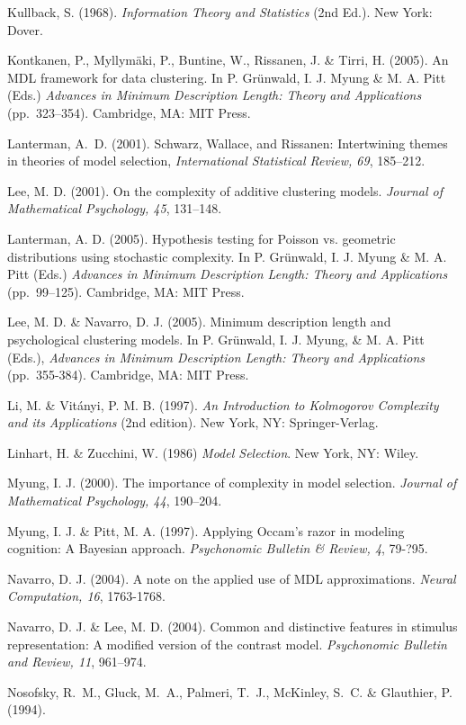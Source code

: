 \documentclass{elsart}
\begin{document}
\begin{list}{}{\setlength{\leftmargin}{12pt}\setlength{\itemindent}{-12pt}\setlength{\parsep}{0pt}}
\item Kullback, S. (1968). {\it Information Theory and Statistics} (2nd Ed.). New York: Dover.
\item Kontkanen, P., Myllym\"{a}ki, P., Buntine, W., Rissanen, J. \& Tirri, H. (2005). An MDL framework
for data clustering. In P. Gr\"{u}nwald, I. J. Myung \& M. A. Pitt (Eds.) {\it Advances in Minimum
Description Length: Theory and Applications} (pp.~323--354). Cambridge, MA: MIT Press.
\item Lanterman, A.~D. (2001). Schwarz, Wallace, and Rissanen: Intertwining themes in theories of model selection, {\em International Statistical Review, 69}, 185--212.
\item Lee, M. D. (2001). On the complexity of additive clustering models. {\it Journal of Mathematical
Psychology, 45}, 131--148.
\item Lanterman, A. D. (2005). Hypothesis testing for Poisson vs. geometric distributions using stochastic
complexity. In P. Gr\"{u}nwald, I. J. Myung \& M. A. Pitt (Eds.) {\it Advances in Minimum
Description Length: Theory and Applications} (pp.~99--125). Cambridge, MA: MIT Press.
\item Lee, M. D. \& Navarro, D. J. (2005). Minimum description length and psychological clustering models.
In P. Gr\"{u}nwald, I. J. Myung, \& M. A. Pitt (Eds.), {\it Advances in Minimum Description Length: Theory
and Applications} (pp.~355-384). Cambridge, MA: MIT Press.
\item Li, M. \& Vit\'{a}nyi, P. M. B. (1997). {\it An Introduction to Kolmogorov Complexity and its
Applications} (2nd edition). New York, NY: Springer-Verlag.
\item Linhart, H. \& Zucchini, W. (1986)  {\em Model Selection}. New York, NY: Wiley.
\item Myung, I. J. (2000). The importance of complexity in model selection. {\it Journal of Mathematical
Psychology, 44}, 190--204.
\item Myung, I. J. \& Pitt, M. A. (1997). Applying Occam's razor in modeling cognition: A Bayesian
approach. {\it Psychonomic Bulletin \& Review, 4}, 79-?95.
\item Navarro, D. J. (2004). A note on the applied use of MDL approximations. {\it Neural Computation, 16},
1763-1768.
\item Navarro, D. J. \& Lee, M. D. (2004). Common and distinctive features in stimulus representation: A modified version of the contrast model. {\it Psychonomic Bulletin and Review, 11}, 961--974.
\item Nosofsky, R.~M., Gluck, M.~A., Palmeri, T.~J., McKinley, S.~C. \& Glauthier, P. (1994).

\end{list}
\end{document}
